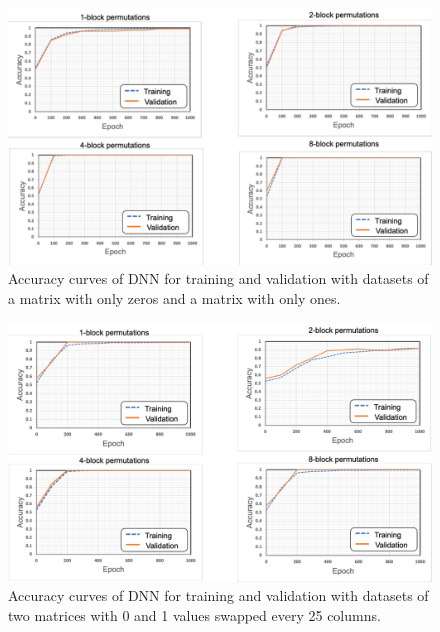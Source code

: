 \begin{figure}[t]
    \begin{center}
        \includegraphics[width=1.0\columnwidth]{figures/main_01mat_graph.pdf}
    \end{center}
    \vspace{-8pt}
	\caption{Accuracy curves of DNN for training and validation with datasets of a matrix with only zeros and a matrix with only ones.}
	\label{fig:accu_01mat}
\end{figure}

\begin{figure}[t]
    \begin{center}
        \includegraphics[width=1.0\columnwidth]{figures/SVGgraph_25stripe.pdf}
    \end{center}
    \vspace{-8pt}
	\caption{Accuracy curves of DNN for training and validation with datasets of two matrices with 0 and 1 values swapped every 25 columns.}
	\label{fig:accu_25stripe}
\end{figure}

